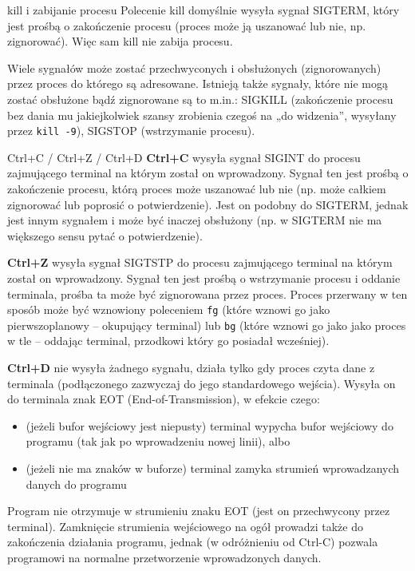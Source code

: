 \documentclass{pdfBooklets}
\begin{document}
\begin{ProTip}{kill i zabijanie procesu}
Polecenie kill domyślnie wysyła sygnał SIGTERM, który jest prośbą o zakończenie procesu (proces może ją uszanować lub nie, np. zignorować). Więc sam kill nie zabija procesu.

Wiele sygnałów może zostać przechwyconych i obsłużonych (zignorowanych) przez proces do którego są adresowane. Istnieją także sygnały, które nie mogą zostać obsłużone bądź zignorowane są to m.in.:
	SIGKILL (zakończenie procesu bez dania mu jakiejkolwiek szansy zrobienia czegoś na „do widzenia”, wysyłany przez \Verb#kill -9#),
	SIGSTOP (wstrzymanie procesu).
\end{ProTip}

\begin{ProTip}{Ctrl+C / Ctrl+Z / Ctrl+D}
\textbf{Ctrl+C} wysyła sygnał SIGINT do procesu zajmującego terminal na którym został on wprowadzony. Sygnał ten jest prośbą o zakończenie procesu, którą proces może uszanować lub nie (np. może całkiem zignorować lub poprosić o potwierdzenie). Jest on podobny do SIGTERM, jednak jest innym sygnałem i może być inaczej obsłużony (np. w SIGTERM nie ma większego sensu pytać o potwierdzenie).

\vspace{6pt}\textbf{Ctrl+Z} wysyła sygnał SIGTSTP do procesu zajmującego terminal na którym został on wprowadzony. Sygnał ten jest prośbą o wstrzymanie procesu i oddanie terminala, prośba ta może być zignorowana przez proces. Proces przerwany w ten sposób może być wznowiony poleceniem \Verb#fg# (które wznowi go jako pierwszoplanowy – okupujący terminal) lub \Verb#bg# (które wznowi go jako jako proces w tle – oddając terminal, przodkowi który go posiadał wcześniej).

\vspace{6pt}\textbf{Ctrl+D} nie wysyła żadnego sygnału, działa tylko gdy proces czyta dane z terminala (podłączonego zazwyczaj do jego standardowego wejścia). Wysyła on do terminala znak EOT (End-of-Transmission), w efekcie czego:
\begin{itemize}
	\item (jeżeli bufor wejściowy jest niepusty) terminal wypycha bufor wejściowy do programu (tak jak po wprowadzeniu nowej linii), albo
	\item (jeżeli nie ma znaków w buforze) terminal zamyka strumień wprowadzanych danych do programu
\end{itemize}
Program nie otrzymuje w strumieniu znaku EOT (jest on przechwycony przez terminal).
Zamknięcie strumienia wejściowego na ogół prowadzi także do zakończenia działania programu, jednak (w odróżnieniu od Ctrl-C) pozwala programowi na normalne przetworzenie wprowadzonych danych.
\end{ProTip}
\end{document}
